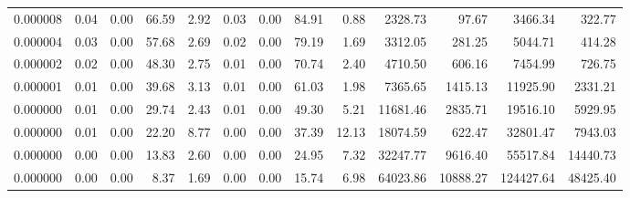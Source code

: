 \begin{tabular}{lrrrrrrrrrrrr}
0.000008 & 0.04 & 0.00 & 66.59 & 2.92 & 0.03 & 0.00 & 84.91 & 0.88 & 2328.73 & 97.67 & 3466.34 & 322.77 \\
0.000004 & 0.03 & 0.00 & 57.68 & 2.69 & 0.02 & 0.00 & 79.19 & 1.69 & 3312.05 & 281.25 & 5044.71 & 414.28 \\
0.000002 & 0.02 & 0.00 & 48.30 & 2.75 & 0.01 & 0.00 & 70.74 & 2.40 & 4710.50 & 606.16 & 7454.99 & 726.75 \\
0.000001 & 0.01 & 0.00 & 39.68 & 3.13 & 0.01 & 0.00 & 61.03 & 1.98 & 7365.65 & 1415.13 & 11925.90 & 2331.21 \\
0.000000 & 0.01 & 0.00 & 29.74 & 2.43 & 0.01 & 0.00 & 49.30 & 5.21 & 11681.46 & 2835.71 & 19516.10 & 5929.95 \\
0.000000 & 0.01 & 0.00 & 22.20 & 8.77 & 0.00 & 0.00 & 37.39 & 12.13 & 18074.59 & 622.47 & 32801.47 & 7943.03 \\
0.000000 & 0.00 & 0.00 & 13.83 & 2.60 & 0.00 & 0.00 & 24.95 & 7.32 & 32247.77 & 9616.40 & 55517.84 & 14440.73 \\
0.000000 & 0.00 & 0.00 & 8.37 & 1.69 & 0.00 & 0.00 & 15.74 & 6.98 & 64023.86 & 10888.27 & 124427.64 & 48425.40 \\
\bottomrule
\end{tabular}
